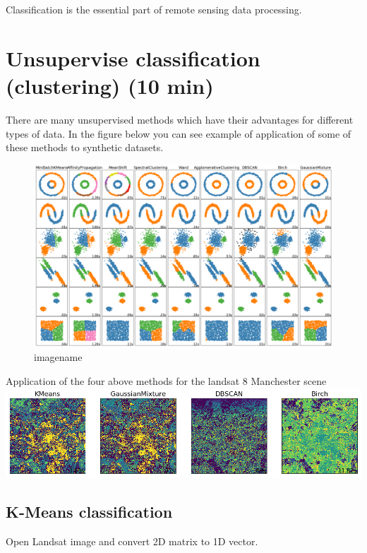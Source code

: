 \documentclass[]{article}
\begin{document}
Classification is the essential part of remote sensing data processing.

\hypertarget{unsupervise-classification-clustering-10-min}{%
\section{Unsupervise classification (clustering) (10
min)}\label{unsupervise-classification-clustering-10-min}}

There are many unsupervised methods which have their advantages for
different types of data. In the figure below you can see example of
application of some of these methods to synthetic datasets.

\begin{figure}
\centering
\includegraphics{clustering.png}
\caption{imagename}
\end{figure}

Application of the four above methods for the landsat 8 Manchester scene
\includegraphics{landsat_clust.png}

\hypertarget{k-means-classification}{%
\subsection{K-Means classification}\label{k-means-classification}}

Open Landsat image and convert 2D matrix to 1D vector.
\end{document}
